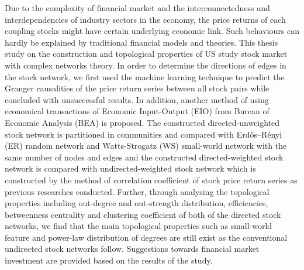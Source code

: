 \abstracttitle
%
{\singlespacing
Due to the complexity of financial market and the interconnectedness and interdependencies of industry sectors in the economy, the price returns of each coupling stocks might have certain underlying economic link. Such behaviours can hardly be explained by traditional financial models and theories. This thesis study on the construction and topological properties of US study stock market with complex networks theory. In order to determine the directions of edges in the stock network, we first used the machine learning technique to predict the Granger causalities of the price return series between all stock pairs while concluded with unsuccessful results. In addition, another method of using economical transactions of Economic Input-Output (EIO) from Bureau of Economic Analysis (BEA) is proposed. The constructed directed-unweighted stock network is partitioned in communities and compared with Erdős–Rényi (ER) random network and Watts-Strogatz (WS) small-world network with the same number of nodes and edges and the constructed directed-weighted stock network is compared with undirected-weighted stock network which is constructed by the method of correlation coefficient of stock price return series as previous researches conducted. Further, through analysing the topological properties including out-degree and out-strength distribution, efficiencies, betweenness centrality and clustering coefficient of both of the directed stock networks, we find that the main topological properties such as small-world feature and power-law distribution of degrees are still exist as the conventional undirected stock networks follow. Suggestions towards financial market investment are provided based on the results of the study.
}

